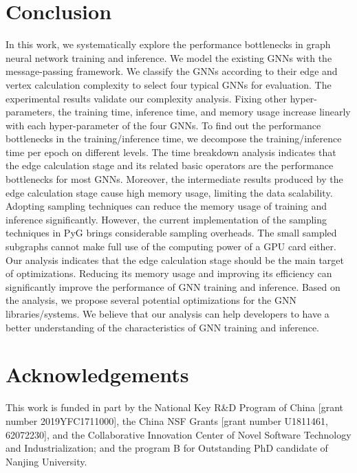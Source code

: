 \section{Conclusion}
\label{sec:conclusion}

In this work, we systematically explore the performance bottlenecks in graph neural network training and inference.
%
We model the existing GNNs with the message-passing framework. 
%
We classify the GNNs according to their edge and vertex calculation complexity to select four typical GNNs for evaluation. 
%
The experimental results validate our complexity analysis.
%
Fixing other hyper-parameters, the training time, inference time, and memory usage increase linearly with each hyper-parameter of the four GNNs.
%
To find out the performance bottlenecks in the training/inference time, we decompose the training/inference time per epoch on different levels.
%
The time breakdown analysis indicates that the edge calculation stage and its related basic operators are the performance bottlenecks for most GNNs.
%
Moreover, the intermediate results produced by the edge calculation stage cause high memory usage, limiting the data scalability.
%
Adopting sampling techniques can reduce the memory usage of training and inference significantly.
%
However, the current implementation of the sampling techniques in PyG brings considerable sampling overheads.
%
The small sampled subgraphs cannot make full use of the computing power of a GPU card either.
% 
Our analysis indicates that the edge calculation stage should be the main target of optimizations.
%
Reducing its memory usage and improving its efficiency can significantly improve the performance of GNN training and inference.
%
Based on the analysis, we propose several potential optimizations for the GNN libraries/systems.
%
We believe that our analysis can help developers to have a better understanding of the characteristics of GNN training and inference.

\section*{Acknowledgements}

This work is funded in part by the National Key R\&D Program of China [grant number 2019YFC1711000], the China NSF Grants [grant number U1811461, 62072230], and the Collaborative Innovation Center of Novel Software Technology and Industrialization; and the program B for Outstanding PhD candidate of Nanjing University.
